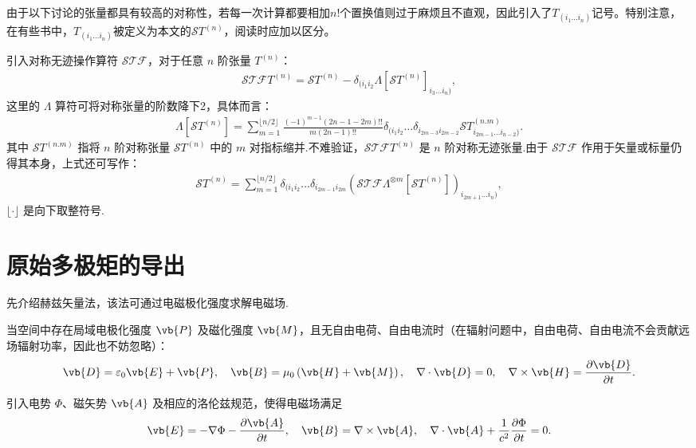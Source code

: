 由于以下讨论的张量都具有较高的对称性，若每一次计算都要相加\(n!\)个置换值则过于麻烦且不直观，因此引入了\(T_{(i_1 \dots i_n)}\)记号。特别注意，在有些书中，\(T_{(i_1 \dots i_n)}\)被定义为本文的\(\mathcal{S} T^{(n)}\)，阅读时应加以区分。

引入对称无迹操作算符 \(\mathcal{STF}\)，对于任意 \(n\) 阶张量 \(T^{(n)}\)：
\begin{align*}
	\mathcal{STF} T^{(n)} = \mathcal{S} T^{(n)} - \delta_{(i_1 i_2} \Lambda[\mathcal{S} T^{(n)}]_{i_3 \dots i_n)},
\end{align*}
这里的 \(\Lambda\) 算符可将对称张量的阶数降下2，具体而言：
\begin{align*}
	\Lambda[\mathcal{S} T^{(n)}] = \sum_{m=1}^{\lfloor n/2 \rfloor} \frac{(-1)^{m-1} (2n - 1 - 2m)!!}{m (2n - 1)!!} \delta_{(i_1 i_2} \dots \delta_{i_{2m-3} i_{2m-2}} \mathcal{S} T^{(n.m)}_{i_{2m-1} \dots i_{n-2})}.
\end{align*}
其中 \(\mathcal{S}T^{(n.m)}\) 指将 \(n\) 阶对称张量 \(\mathcal{S}T^{(n)}\) 中的 \(m\) 对指标缩并.不难验证，\(\mathcal{STF}T^{(n)}\) 是 \(n\) 阶对称无迹张量.由于 \(\mathcal{STF}\) 作用于矢量或标量仍得其本身，上式还可写作：
\begin{align*}
	\mathcal{S}T^{(n)} = \sum_{m=1}^{\lfloor n/2 \rfloor} \delta_{(i_1 i_2} \dots \delta_{i_{2m-1} i_{2m}} \left( \mathcal{STF}\Lambda^{\otimes m}[\mathcal{S}T^{(n)}] \right)_{i_{2m+1} \dots i_n)},
\end{align*}
\(\lfloor \cdot \rfloor\) 是向下取整符号.

\section{原始多极矩的导出}
先介绍赫兹矢量法，该法可通过电磁极化强度求解电磁场.

当空间中存在局域电极化强度 \(\vb{P}\) 及磁化强度 \(\vb{M}\)，且无自由电荷、自由电流时（在辐射问题中，自由电荷、自由电流不会贡献远场辐射功率，因此也不妨忽略）：
\begin{align*}
	\vb{D} = \varepsilon_0 \vb{E} + \vb{P}, \quad \vb{B} = \mu_0 \left( \vb{H} + \vb{M} \right), \quad \nabla \cdot \vb{D} = 0, \quad \nabla \times \vb{H} = \frac{\partial \vb{D}}{\partial t}.
\end{align*}

引入电势 \(\Phi\)、磁矢势 \(\vb{A}\) 及相应的洛伦兹规范，使得电磁场满足
\begin{align*}
	\vb{E} = -\nabla \Phi - \frac{\partial \vb{A}}{\partial t}, \quad \vb{B} = \nabla \times \vb{A}, \quad \nabla \cdot \vb{A} + \frac{1}{c^2}\frac{\partial \Phi}{\partial t} = 0.
\end{align*}

